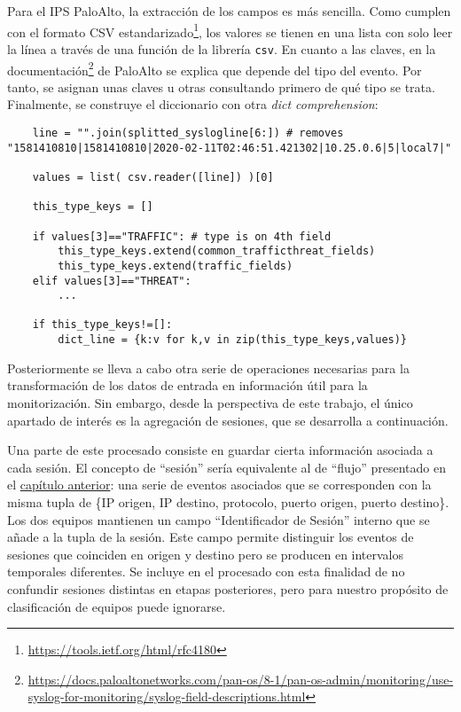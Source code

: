Para el IPS PaloAlto, la extracción de los campos es más sencilla.
Como cumplen con el formato CSV estandarizado\footnote{\url{https://tools.ietf.org/html/rfc4180}}, los valores se tienen en una lista
con solo leer la línea a través de una función de la librería \texttt{csv}.
En cuanto a las claves, en la documentación\footnote{\url{https://docs.paloaltonetworks.com/pan-os/8-1/pan-os-admin/monitoring/use-syslog-for-monitoring/syslog-field-descriptions.html}}
de PaloAlto se explica que depende del tipo del evento.
Por tanto, se asignan unas claves u otras consultando primero de qué tipo se trata.
Finalmente, se construye el diccionario con otra \emph{dict comprehension}:

\begin{verbatim}
    line = "".join(splitted_syslogline[6:]) # removes "1581410810|1581410810|2020-02-11T02:46:51.421302|10.25.0.6|5|local7|"

    values = list( csv.reader([line]) )[0]

    this_type_keys = []

    if values[3]=="TRAFFIC": # type is on 4th field
        this_type_keys.extend(common_trafficthreat_fields)
        this_type_keys.extend(traffic_fields)
    elif values[3]=="THREAT":
        ...

    if this_type_keys!=[]:
        dict_line = {k:v for k,v in zip(this_type_keys,values)}
\end{verbatim}

Posteriormente se lleva a cabo otra serie de operaciones necesarias para la transformación de los datos de entrada en información útil para la monitorización.
Sin embargo, desde la perspectiva de este trabajo, el único apartado de interés es la agregación de sesiones, que se desarrolla a continuación.

Una parte de este procesado consiste en guardar cierta información asociada a cada sesión.
El concepto de ``sesión'' sería equivalente al de ``flujo'' presentado en el \hyperref[chap:estadodelarte]{capítulo anterior}:
una serie de eventos asociados que se corresponden con la misma tupla de \{IP origen, IP destino, protocolo, puerto origen, puerto destino\}.
Los dos equipos mantienen un campo ``Identificador de Sesión'' interno que se añade a la tupla de la sesión.
Este campo permite distinguir los eventos de sesiones que coinciden en origen y destino pero se producen en intervalos temporales diferentes.
Se incluye en el procesado con esta finalidad de no confundir sesiones distintas en etapas posteriores, pero para nuestro propósito de clasificación de equipos puede ignorarse.


